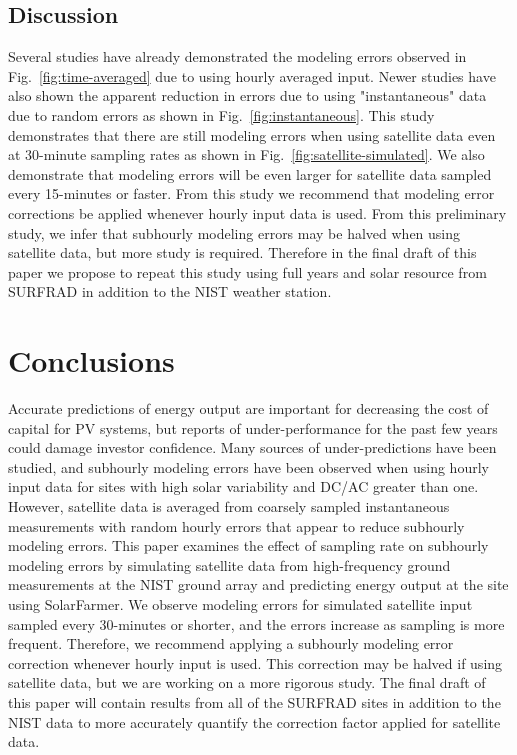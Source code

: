 \documentclass[conference]{IEEEtran}
\begin{document}
\subsection{Discussion}
Several studies have already demonstrated the modeling errors observed in Fig.~\ref{fig:time-averaged} due to using hourly averaged input. Newer studies have also shown the apparent reduction in errors due to using "instantaneous" data due to random errors as shown in Fig.~\ref{fig:instantaneous}. This study demonstrates that there are still modeling errors when using satellite data even at 30-minute sampling rates as shown in Fig.~\ref{fig:satellite-simulated}. We also demonstrate that modeling errors will be even larger for satellite data sampled every 15-minutes or faster. From this study we recommend that modeling error corrections be applied whenever hourly input data is used. From this preliminary study, we infer that subhourly modeling errors may be halved when using satellite data, but more study is required. Therefore in the final draft of this paper we propose to repeat this study using full years and solar resource from SURFRAD in addition to the NIST weather station.

\section{Conclusions}
Accurate predictions of energy output are important for decreasing the cost of capital for PV systems, but reports of under-performance for the past few years could damage investor confidence. Many sources of under-predictions have been studied, and subhourly modeling errors have been observed when using hourly input data for sites with high solar variability and DC/AC greater than one. However, satellite data is averaged from coarsely sampled instantaneous measurements with random hourly errors that appear to reduce subhourly modeling errors. This paper examines the effect of sampling rate on subhourly modeling errors by simulating satellite data from high-frequency ground measurements at the NIST ground array and predicting energy output at the site using SolarFarmer. We observe modeling errors for simulated satellite input sampled every 30-minutes or shorter, and the errors increase as sampling is more frequent. Therefore, we recommend applying a subhourly modeling error correction whenever hourly input is used. This correction may be halved if using satellite data, but we are working on a more rigorous study. The final draft of this paper will contain results from all of the SURFRAD sites in addition to the NIST data to more accurately quantify the correction factor applied for satellite data.



\end{document}
